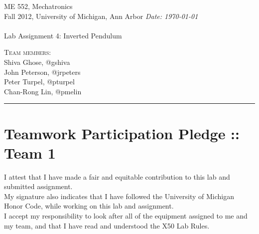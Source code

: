 \documentclass{article}
\newcommand{\shortbar}{\begin{center}\rule{5ex}{0.1pt}\end{center}}
\newcommand{\courseNumber}{ME 552}
\newcommand{\courseTitle}{Mechatronics}
\newcommand{\semester}{Fall 2012}
\theoremstyle{plain}
\theoremstyle{definition}
\theoremstyle{remark}
\newenvironment{solution}[1]{\medskip\noindent{\bf Problem #1.~}}{\shortbar}
\newcommand{\solutions}[4]{
\vspace{-2ex}
\begin{center}
{\small  \courseNumber, \courseTitle
\hfill {\Large \bf {#1} }\\
\semester, University of Michigan, Ann Arbor \hfill
{\em Date: #3}}\\
\vspace{-1ex}
\hrulefill\\
\vspace{4ex}
{\LARGE Lab Assignment #2}\\
\vspace{2ex}
\end{center}
\begin{trivlist}
\item \textsc{Team members:\\} {#4}
\end{trivlist}
\noindent
\shortbar
\vspace{3ex}
}
\begin{document}
\solutions{}{4: Inverted Pendulum}{\today}{Shiva Ghose, @gshiva\\ John Peterson, @jrpeters\\ Peter Turpel, @pturpel\\ Chan-Rong Lin, @pmelin}
%
%
\section*{Teamwork Participation Pledge :: Team 1}

I attest that I have made a fair and equitable contribution to this lab and submitted 
assignment. \\

My signature also indicates that I have followed the University of Michigan Honor Code, 
while working on this lab and assignment.\\

I accept my responsibility to look after all of the equipment assigned to me and my team, 
and that I have read and understood the X50 Lab Rules.\\
\end{document}
